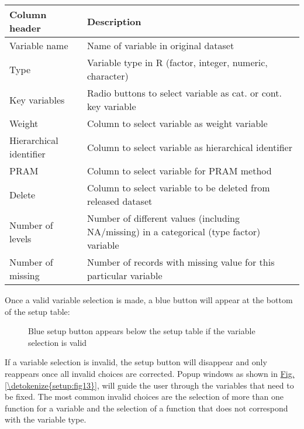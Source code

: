 \documentclass[letterpaper,10pt,english]{sphinxmanual}
\begin{document}
\begin{savenotes}\sphinxattablestart
\centering
{}
\label{\detokenize{setup:tabsetup1}}\label{\detokenize{setup:id2}}
\sphinxaftercaption
\begin{tabulary}{\linewidth}[t]{|T|T|}
\hline
\sphinxstyletheadfamily 
Column header
&\sphinxstyletheadfamily 
Description
\\
\hline
Variable name
&
Name of variable in original dataset
\\
\hline
Type
&
Variable type in R (factor, integer, numeric, character)
\\
\hline
Key variables
&
Radio buttons to select variable as cat. or cont. key variable
\\
\hline
Weight
&
Column to select variable as weight variable
\\
\hline
Hierarchical identifier
&
Column to select variable as hierarchical identifier
\\
\hline
PRAM
&
Column to select variable for PRAM method
\\
\hline
Delete
&
Column to select variable to be deleted from released dataset
\\
\hline
Number of levels
&
Number of different values (including NA/missing) in a categorical (type factor) variable
\\
\hline
Number of missing
&
Number of records with missing value for this particular variable
\\
\hline
\end{tabulary}
\par
\sphinxattableend\end{savenotes}

Once a valid variable selection is made, a blue button will appear at the bottom of the
setup table:

\begin{figure}[htbp]
\centering
\capstart

\noindent{}
\caption{Blue setup button appears below the setup table if the variable selection is valid}\label{\detokenize{setup:fig12}}\label{\detokenize{setup:id3}}\end{figure}

If a variable selection is invalid, the setup button will disappear and only reappears once
all invalid choices are corrected. Popup windows as shown in \hyperref[\detokenize{setup:fig13}]{Fig.\@ \ref{\detokenize{setup:fig13}}},
will guide the user through the variables
that need to be fixed. The most common invalid choices are the selection of more
than one function for a variable and the selection of a function that does not correspond
with the variable type.
\end{document}
